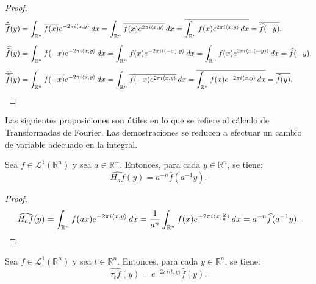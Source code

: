 \begin{proof}
\begin{align*}
      \widehat{\overline{f}}(y) &= \int_{\mathbb{R}^n} \overline{f(x)}e^{-2\pi i \langle x, y \rangle} \, dx = \int_{\mathbb{R}^n} \overline{f(x)e^{2\pi i \langle x, y \rangle}} \, dx =  \overline{\int_{\mathbb{R}^n} f(x)e^{2\pi i \langle x, y \rangle} \, dx } =\overline{\widehat{f}(-y)}, \\[0.2cm]
       \widehat{\widetilde{f}(}y) &= \int_{\mathbb{R}^n} f(-x)e^{-2\pi i \langle x, y \rangle} \, dx = \int_{\mathbb{R}^n} f(x)e^{-2\pi i \langle (-x), y \rangle} \, dx  =  \int_{\mathbb{R}^n} f(x)e^{2\pi i \langle x, (-y) \rangle} \, dx  =\widehat{f}(-y),\\[0.2cm]
       \widehat{\overline{\widetilde{f}(}}y) &= \int_{\mathbb{R}^n} \overline{f(-x)}e^{-2\pi i \langle x, y \rangle} \, dx = \int_{\mathbb{R}^n} \overline{f(-x)e^{2\pi i \langle x, y \rangle}} \, dx  =  \overline{\int_{\mathbb{R}^n} f(x)e^{-2\pi i \langle x, y \rangle} \, dx } =\overline{\widehat{f}(y)}. \qedhere
\end{align*} 
\end{proof}




\noindent Las siguientes proposiciones son útiles en lo que se refiere al cálculo de Transformadas de Fourier. Las demostraciones se reducen a efectuar un cambio de variable adecuado en la integral.

\begin{proposicion}\label{esca}
    Sea $f \in \mathscr{L}^1(\mathbb{R}^n)$ y sea $a \in \mathbb{R}^+$. Entonces, para cada $y \in \mathbb{R}^n$, se tiene:
    \begin{equation}
        \widehat{H_af}(y) = a^{-n}\widehat{f}(a^{-1}y).
    \end{equation}
\end{proposicion}

\begin{proof}
\begin{equation*}
     \widehat{H_af}(y) = \int_{\mathbb{R}^n}f(ax) e^{-2 \pi i \langle x, y \rangle} \, dx = \frac{1}{a^n}\int_{\mathbb{R}^n}f(x) e^{-2 \pi i \langle x, \frac{y}{a} \rangle} \, dx =  a^{-n}\widehat{f}(a^{-1}y). \qedhere
\end{equation*}
\end{proof}


\begin{proposicion}\label{prop:tras}
    Sea $f \in \mathscr{L}^1(\mathbb{R}^n)$ y sea $t \in \mathbb{R}^n$. Entonces, para cada $y \in \mathbb{R}^n$, se tiene:
    \begin{equation}
        \widehat{\tau_tf}(y) =  e^{-2 \pi i \langle t, y \rangle}\widehat{f}(y).
    \end{equation}
    
\end{proposicion}

